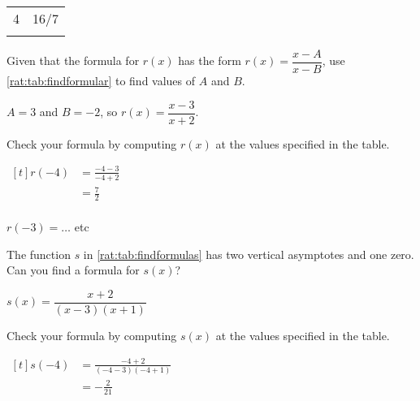 \begin{exercises}
\begin{problem}
\begin{table}[!htb]
\begin{widepage}
\begin{subtable}{.2\textwidth}
\begin{tabular}{S[table-format=1.0]S[table-format=1.0]}
			4             & \num{16/7}    \\\lastline     
		\end{tabular}
	\end{subtable}
	\end{widepage}
\end{table}
\begin{subproblem}
	Given that the formula for $r(x)$ has the form $r(x)=\dfrac{x-A}{x-B}$, use \cref{rat:tab:findformular}
	to find values of $A$ and $B$.
	\begin{shortsolution}
		$A=3$ and $B=-2$, so $r(x)=\dfrac{x-3}{x+2}$.
	\end{shortsolution}
\end{subproblem}
\begin{subproblem}
	Check your formula by computing $r(x)$ at the values specified in the table.
	\begin{shortsolution}
		$\begin{aligned}[t]
			r(-4) & = \frac{-4-3}{-4+2} \\ 
			      & = \frac{7}{2}       \\       
		\end{aligned}$
				
		$r(-3)=\ldots$ etc
	\end{shortsolution}
\end{subproblem}
\begin{subproblem}
	The function $s$ in \cref{rat:tab:findformulas} has two vertical asymptotes and one zero. 
	Can you find a formula for $s(x)$?
	\begin{shortsolution}
		$s(x)=\dfrac{x+2}{(x-3)(x+1)}$
	\end{shortsolution}
\end{subproblem}
\begin{subproblem}
	Check your formula by computing $s(x)$ at the values specified in the table.
	\begin{shortsolution}
		$\begin{aligned}[t]
			s(-4) & =\frac{-4+2}{(-4-3)(-4+1)} \\ 
			      & =-\frac{2}{21}             
		\end{aligned}$
				

\end{shortsolution}
\end{subproblem}
\end{problem}
\end{exercises}
